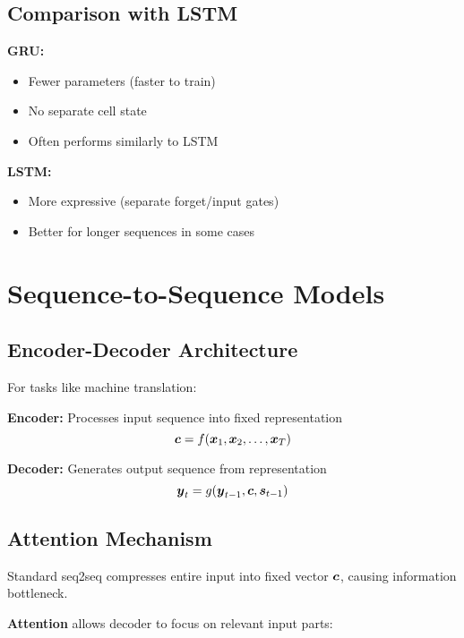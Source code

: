 \subsection{Comparison with LSTM}

\textbf{GRU:}
\begin{itemize}
    \item Fewer parameters (faster to train)
    \item No separate cell state
    \item Often performs similarly to LSTM
\end{itemize}

\textbf{LSTM:}
\begin{itemize}
    \item More expressive (separate forget/input gates)
    \item Better for longer sequences in some cases
\end{itemize}

\section{Sequence-to-Sequence Models}
\label{sec:seq2seq}

\subsection{Encoder-Decoder Architecture}

For tasks like machine translation:

\textbf{Encoder:} Processes input sequence into fixed representation
\begin{equation}
\boldsymbol{c} = f(\boldsymbol{x}_1, \boldsymbol{x}_2, \ldots, \boldsymbol{x}_T)
\end{equation}

\textbf{Decoder:} Generates output sequence from representation
\begin{equation}
\boldsymbol{y}_t = g(\boldsymbol{y}_{t-1}, \boldsymbol{c}, \boldsymbol{s}_{t-1})
\end{equation}

\subsection{Attention Mechanism}

Standard seq2seq compresses entire input into fixed vector $\boldsymbol{c}$, causing information bottleneck.

\textbf{Attention} allows decoder to focus on relevant input parts:

